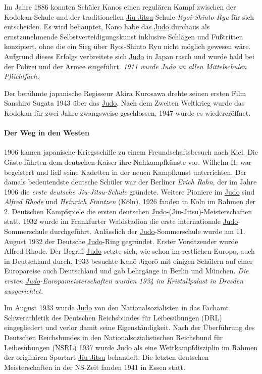 \documentclass[justified, a4paper, notitlepage, captions=tableheading, nobib]{tufte-handout}
\begin{document}
Im Jahre 1886 konnten Schüler Kanos einen regulären Kampf zwischen der Kodokan-Schule und der traditionellen \hyperref[orgb1f4d96]{Jiu Jitsu}-Schule \emph{Ryoi-Shinto-Ryu} für sich entscheiden. Es wird behauptet, Kano habe das \hyperref[org60aba15]{Judo} durchaus als ernstzunehmende Selbstverteidigungskunst inklusive Schlägen und Fußtritten konzipiert, ohne die ein Sieg über Ryoi-Shinto Ryu nicht möglich gewesen wäre. Aufgrund dieses Erfolgs verbreitete sich \hyperref[org60aba15]{Judo} in Japan rasch und wurde bald bei der Polizei und der Armee eingeführt. \emph{1911 wurde \hyperref[org60aba15]{Judo} an allen Mittelschulen Pflichtfach.}

Der berühmte japanische Regisseur Akira Kurosawa drehte seinen ersten Film Sanshiro Sugata 1943 über das \hyperref[org60aba15]{Judo}.
Nach dem Zweiten Weltkrieg wurde das Kodokan für zwei Jahre zwangsweise geschlossen, 1947 wurde es wiedereröffnet.

\paragraph{Der Weg in den Westen}
\label{sec:org84637d0}
1906 kamen japanische Kriegsschiffe zu einem Freundschaftsbesuch nach Kiel. Die Gäste führten dem deutschen Kaiser ihre Nahkampfkünste vor. Wilhelm II. war begeistert und ließ seine Kadetten in der neuen Kampfkunst unterrichten. Der damals bedeutendste deutsche Schüler war der Berliner \emph{Erich Rahn}, der im Jahre 1906 die \emph{erste deutsche Jiu-Jitsu-Schule} gründete. Weitere Pioniere im \hyperref[org60aba15]{Judo} sind \emph{Alfred Rhode} und \emph{Heinrich Frantzen} (Köln). 1926 fanden in Köln im Rahmen der 2. Deutschen Kampfspiele die ersten deutschen \hyperref[org60aba15]{Judo}-(Jiu-Jitsu)-Meisterschaften statt. 1932 wurde im Frankfurter Waldstadion die erste internationale \hyperref[org60aba15]{Judo}-Sommerschule durchgeführt. Anlässlich der \hyperref[org60aba15]{Judo}-Sommerschule wurde am 11. August 1932 der Deutsche \hyperref[org60aba15]{Judo}-Ring gegründet. Erster Vorsitzender wurde Alfred Rhode. Der Begriff \hyperref[org60aba15]{Judo} setzte sich, wie schon im restlichen Europa, auch in Deutschland durch. 1933 besuchte Kanō Jigorō mit einigen Schülern auf einer Europareise auch Deutschland und gab Lehrgänge in Berlin und München. \emph{Die ersten \hyperref[org60aba15]{Judo}-Europameisterschaften wurden 1934 im Kristallpalast in Dresden ausgerichtet.}

Im August 1933 wurde \hyperref[org60aba15]{Judo} von den Nationalsozialisten in das Fachamt Schwerathletik des Deutschen Reichsbundes für Leibesübungen (DRL) eingegliedert und verlor damit seine Eigenständigkeit. Nach der Überführung des Deutschen Reichsbundes in den Nationalsozialistischen Reichsbund für Leibesübungen (NSRL) 1937 wurde \hyperref[org60aba15]{Judo} als eine Wettkampfdisziplin im Rahmen der originären Sportart \hyperref[orgb1f4d96]{Jiu Jitsu} behandelt. Die letzten deutschen Meisterschaften in der NS-Zeit fanden 1941 in Essen statt.
\end{document}
